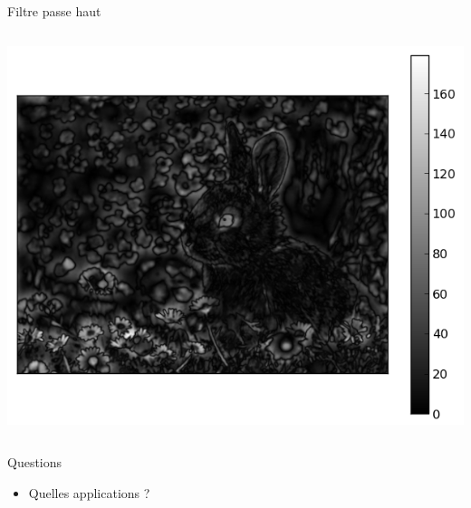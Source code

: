 \documentclass[8pt,a4paper]{beamer}
\begin{document}
\begin{frame}{Filtre passe haut}
 \begin{columns}
\includegraphics[width=1.\textwidth]{figures/lapin_highpass.png}

\end{columns}
\begin{alertblock}{Questions}
\begin{itemize}
\item Quelles applications ?
\end{itemize}
\end{alertblock}
\end{frame}
\end{document}
